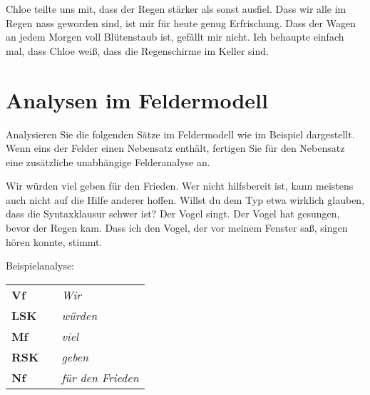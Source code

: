 \begin{exe}
\setcounter{xnumi}{0}
  \ex Chloe teilte uns mit, dass der Regen stärker als sonst ausfiel.
  \ex Dass wir alle im Regen nass geworden sind, ist mir für heute genug Erfrischung.
  \ex Dass der Wagen an jedem Morgen voll Blütenstaub ist, gefällt mir nicht.
  \ex Ich behaupte einfach mal, dass Chloe weiß, dass die Regenschirme im Keller sind.
\end{exe}


\section{Analysen im Feldermodell}\label{sec:felder}

Analysieren Sie die folgenden Sätze im Feldermodell wie im Beispiel dargestellt.
Wenn eins der Felder einen Nebensatz enthält, fertigen Sie für den Nebensatz eine zusätzliche unabhängige Felderanalyse an.

\begin{exe}
\setcounter{xnumi}{0}
  \ex Wir würden viel geben für den Frieden.
  \ex Wer nicht hilfsbereit ist, kann meistens auch nicht auf die Hilfe anderer hoffen.
  \ex Willst du dem Typ etwa wirklich glauben, dass die Syntaxklausur schwer ist?
  \ex Der Vogel singt.
  \ex Der Vogel hat gesungen, bevor der Regen kam.
  \ex Dass ich den Vogel, der vor meinem Fenster saß, singen hören konnte, stimmt.
\end{exe}

Beispielanalyse:

\Zeile

\begin{tabular}[h]{lp{1em}l}
  \textbf{Vf}  && \textit{Wir} \\
  \textbf{LSK} && \textit{würden} \\
  \textbf{Mf}  && \textit{viel} \\
  \textbf{RSK} && \textit{geben} \\
  \textbf{Nf}  && \textit{für den Frieden} \\
\end{tabular}

